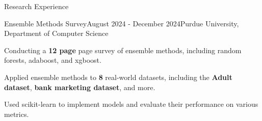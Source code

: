 \documentclass[
    11pt, %
]{resume} %
\begin{document}
\vspace*{-0.3cm}
\begin{rSection}{Research Experience}
  \begin{rSubsection}{Ensemble Methods Survey}{August 2024 - December 2024}{Purdue University, Department of Computer Science}{}
  \item Conducting a \textbf{12 page} page survey of ensemble methods, including random forests, adaboost, and xgboost.
  \item Applied ensemble methods to \textbf{8} real-world datasets, including the \textbf{Adult dataset}, \textbf{bank marketing dataset}, and more.
  \item Used scikit-learn to implement models and evaluate their performance on various metrics.
  \end{rSubsection}
\end{rSection}
\end{document}
